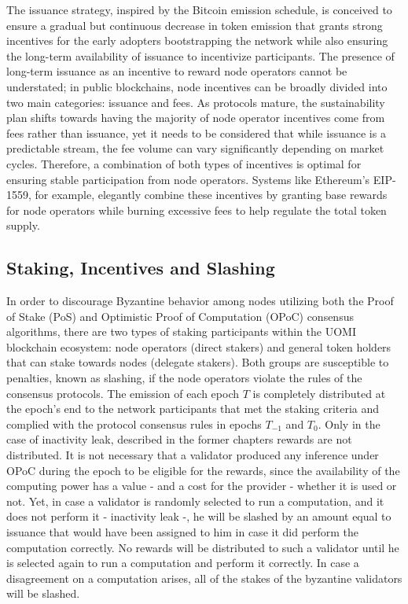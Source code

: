 \documentclass{article}
\begin{document}
The issuance strategy, inspired by the Bitcoin emission schedule, is conceived to ensure a gradual but continuous decrease in token emission that grants strong incentives for the early adopters bootstrapping the network while also ensuring the long-term availability of issuance to incentivize participants.
The presence of long-term issuance as an incentive to reward node operators cannot be understated; in public blockchains, node incentives can be broadly divided into two main categories: issuance and fees. As protocols mature, the sustainability plan shifts towards having the majority of node operator incentives come from fees rather than issuance, yet it needs to be considered that while issuance is a predictable stream, the fee volume can vary significantly depending on market cycles. Therefore, a combination of both types of incentives is optimal for ensuring stable participation from node operators. Systems like Ethereum’s EIP-1559, for example, elegantly combine these incentives by granting base rewards for node operators while burning excessive fees to help regulate the total token supply. 

\subsection{Staking, Incentives and Slashing}

In order to discourage Byzantine behavior among nodes utilizing both the Proof of Stake (PoS) and Optimistic Proof of Computation (OPoC) consensus algorithms, there are two types of staking participants within the UOMI blockchain ecosystem: node operators (direct stakers) and general token holders that can stake towards nodes (delegate stakers). Both groups are susceptible to penalties, known as slashing, if the node operators violate the rules of the consensus protocols. 
The emission of each epoch \(T\) is completely distributed at the epoch's end to the network participants that met the staking criteria and complied with the protocol consensus rules in epochs \( T_{-1} \) and \(T_0\). Only in the case of inactivity leak, described in the former chapters rewards are not distributed. It is not necessary that a validator produced any inference under OPoC during the epoch to be eligible for the rewards, since the availability of the computing power has a value - and a cost for the provider - whether it is used or not. 
Yet, in case a validator is randomly selected to run a computation, and it does not perform it - inactivity leak -, he will be slashed by an amount equal to issuance that would have been assigned to him in case it did perform the computation correctly. No rewards will be distributed to such a validator until he is selected again to run a computation and perform it correctly. In case a disagreement on a computation arises, all of the stakes of the byzantine validators will be slashed. 
\end{document}
